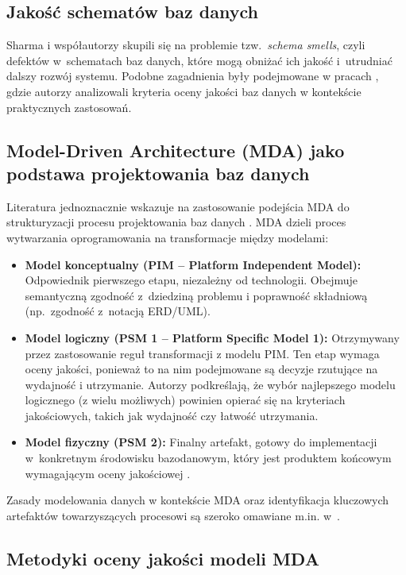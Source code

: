 \subsection{Jakość schematów baz danych}

Sharma i współautorzy \cite{Sharma2018} skupili się na problemie tzw.\ \emph{schema smells}, czyli defektów w~schematach baz danych, które mogą obniżać ich jakość i~utrudniać dalszy rozwój systemu. Podobne zagadnienia były podejmowane w pracach \cite{Kedzia2011,Tuzinkiewicz2013}, gdzie autorzy analizowali kryteria oceny jakości baz danych w kontekście praktycznych zastosowań.

\subsection{Model-Driven Architecture (MDA) jako podstawa projektowania baz danych}

Literatura jednoznacznie wskazuje na zastosowanie podejścia MDA do strukturyzacji procesu projektowania baz danych \cite{Dubielewicz2007Eval,Quad2010,Tuzinkiewicz2013}. MDA dzieli proces wytwarzania oprogramowania na transformacje między modelami:

\begin{itemize}
  \item \textbf{Model konceptualny (PIM -- Platform Independent Model):} Odpowiednik pierwszego etapu, niezależny od technologii. Obejmuje semantyczną zgodność z~dziedziną problemu i poprawność składniową (np.\ zgodność z~notacją ERD/UML).
  \item \textbf{Model logiczny (PSM 1 -- Platform Specific Model 1):} Otrzymywany przez zastosowanie reguł transformacji z modelu PIM. Ten etap wymaga oceny jakości, ponieważ to na nim podejmowane są decyzje rzutujące na wydajność i utrzymanie. Autorzy \cite{Dubielewicz2007Eval} podkreślają, że wybór najlepszego modelu logicznego (z wielu możliwych) powinien opierać się na kryteriach jakościowych, takich jak wydajność czy łatwość utrzymania.
  \item \textbf{Model fizyczny (PSM 2):} Finalny artefakt, gotowy do implementacji w~konkretnym środowisku bazodanowym, który jest produktem końcowym wymagającym oceny jakościowej \cite{Kedzia2011}.
\end{itemize}

Zasady modelowania danych w kontekście MDA oraz identyfikacja kluczowych artefaktów towarzyszących procesowi są szeroko omawiane m.in.  w~\cite{Tuzinkiewicz2013}.

\subsection{Metodyki oceny jakości modeli MDA}

